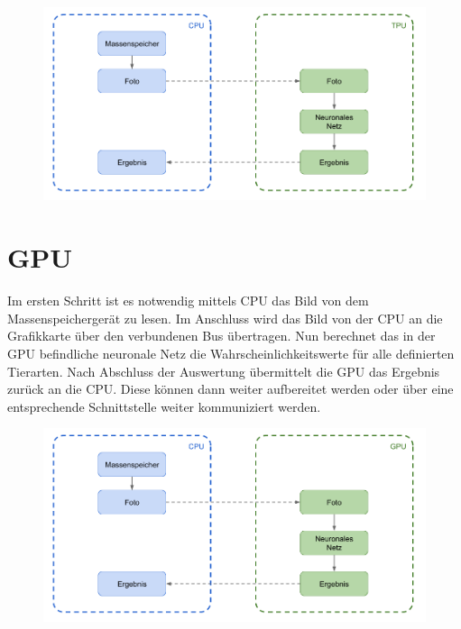 \begin{figure}[htbp]
	\centering
		\includegraphics[width=1.00\textwidth]{BilderPDF/zielsetzung/System-TPU.png}
	\label{fig:System-TPU}
\end{figure}

\newpage


\section*{\LARGE\textbf{GPU}}

Im ersten Schritt ist es notwendig mittels CPU das Bild von dem Massenspeichergerät zu lesen. Im Anschluss wird das Bild von der CPU an die Grafikkarte über den verbundenen Bus übertragen. Nun berechnet das in der GPU befindliche neuronale Netz die Wahrscheinlichkeitswerte für alle definierten Tierarten. Nach Abschluss der Auswertung übermittelt die GPU das Ergebnis zurück an die CPU. Diese können dann weiter aufbereitet werden oder über eine entsprechende Schnittstelle weiter kommuniziert werden. 

\begin{figure}[htbp]
	\centering
		\includegraphics[width=1.00\textwidth]{BilderPDF/zielsetzung/System-GPU.png}
	\label{fig:System-GPU}
\end{figure}


